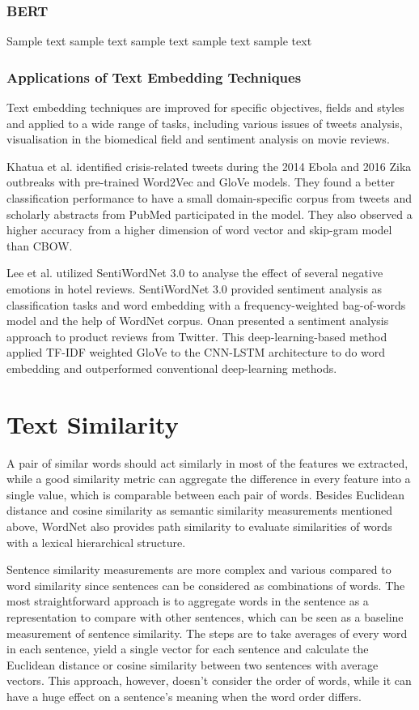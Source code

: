 \subsubsection{BERT}
Sample text sample text sample text sample text sample text

\subsubsection{Applications of Text Embedding Techniques}
Text embedding techniques are improved for specific objectives, fields and styles and applied to a wide range of tasks, including various issues of tweets analysis\cite{mottaghinia2021}, visualisation in the biomedical field\cite{oubenali2022} and sentiment analysis on movie reviews\cite{sivakumar2021}.

Khatua et al.\cite{khatua2019} identified crisis-related tweets during the 2014 Ebola and 2016 Zika outbreaks with pre-trained Word2Vec and GloVe models.
They found a better classification performance to have a small domain-specific corpus from tweets and scholarly abstracts from PubMed participated in the model.
They also observed a higher accuracy from a higher dimension of word vector and skip-gram model than CBOW.

Lee et al.\cite{lee2017} utilized SentiWordNet 3.0 to analyse the effect of several negative emotions in hotel reviews.
SentiWordNet 3.0\cite{baccianella2010} provided sentiment analysis as classification tasks and word embedding with a frequency-weighted bag-of-words model and the help of WordNet corpus.
Onan\cite{onan2021} presented a sentiment analysis approach to product reviews from Twitter.
This deep-learning-based method applied TF-IDF weighted GloVe to the CNN-LSTM architecture to do word embedding and outperformed conventional deep-learning methods.


\section{Text Similarity}
A pair of similar words should act similarly in most of the features we extracted, while a good similarity metric can aggregate the difference in every feature into a single value, which is comparable between each pair of words.
Besides Euclidean distance and cosine similarity as semantic similarity measurements mentioned above, WordNet also provides path similarity to evaluate similarities of words with a lexical hierarchical structure.

Sentence similarity measurements are more complex and various compared to word similarity since sentences can be considered as combinations of words.
The most straightforward approach is to aggregate words in the sentence as a representation to compare with other sentences, which can be seen as a baseline measurement of sentence similarity.
The steps are to take averages of every word in each sentence, yield a single vector for each sentence and calculate the Euclidean distance or cosine similarity between two sentences with average vectors.
This approach, however, doesn't consider the order of words, while it can have a huge effect on a sentence's meaning when the word order differs.

